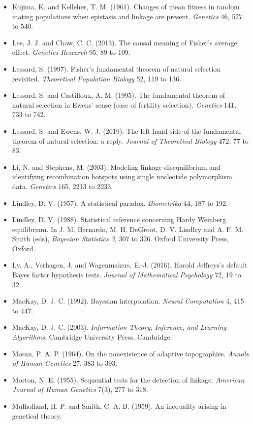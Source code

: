 \begin{itemize}
\item Kojima, K. and Kelleher, T. M. (1961). Changes of mean fitness in random mating populations
when epistasis and linkage are present. \emph{Genetics} 46, 527 to 540.
\item Lee, J. J. and Chow, C. C. (2013). The causal meaning of Fisher's average effect.
\emph{Genetics Research} 95, 89 to 109.
\item Lessard, S. (1997). Fisher's fundamental theorem of natural selection revisited.
\emph{Theoretical Population Biology} 52, 119 to 136.
\item Lessard, S. and Castilloux, A.-M. (1995). The fundamental theorem of natural selection in
Ewens' sense (case of fertility selection). \emph{Genetics} 141, 733 to 742.
\item Lessard, S. and Ewens, W. J. (2019). The left hand side of the fundamental theorem of natural
selection: a reply. \emph{Journal of Theoretical Biology} 472, 77 to 83.
\item Li, N. and Stephens, M. (2003). Modeling linkage disequilibrium and identifying recombination
hotspots using single nucleotide polymorphism data. \emph{Genetics} 165, 2213 to 2233.
\item Lindley, D. V. (1957). A statistical paradox. \emph{Biometrika} 44, 187 to 192.
\item Lindley, D. V. (1988). Statistical inference concerning Hardy Weinberg equilibrium. In
J. M. Bernardo, M. H. DeGroot, D. V. Lindley and A. F. M. Smith (eds), \emph{Bayesian Statistics
3}, 307 to 326. Oxford University Press, Oxford.
\item Ly, A., Verhagen, J. and Wagenmakers, E.-J. (2016). Harold Jeffreys's default Bayes factor
hypothesis tests. \emph{Journal of Mathematical Psychology} 72, 19 to 32.
\item MacKay, D. J. C. (1992). Bayesian interpolation. \emph{Neural Computation} 4, 415 to 447.
\item MacKay, D. J. C. (2003). \emph{Information Theory, Inference, and Learning Algorithms}.
Cambridge University Press, Cambridge.
\item Moran, P. A. P. (1964). On the nonexistence of adaptive topographies.
\emph{Annals of Human Genetics} 27, 383 to 393.
\item Morton, N. E. (1955). Sequential tests for the detection of linkage.
\emph{American Journal of Human Genetics} 7(3), 277 to 318.
\item Mulholland, H. P. and Smith, C. A. B. (1959). An inequality arising in genetical theory.

\end{itemize}
